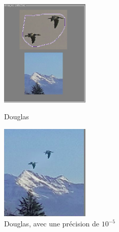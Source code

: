 \begin{figure}[!htb]
   \begin{minipage}{0.5\textwidth}
     \centering
     \includegraphics[width = 120pt]{Images/Resultats/Douglas2b.png}
     \caption{Douglas}
      \end{minipage}\hfill
   \begin{minipage}{0.5\textwidth}
     \centering
     \includegraphics[width = 120pt]{Images/Resultats/Douglas2.png}
     \caption{Douglas, avec une précision de $10^{-5}$}
      \end{minipage}\hfill
\end{figure}

